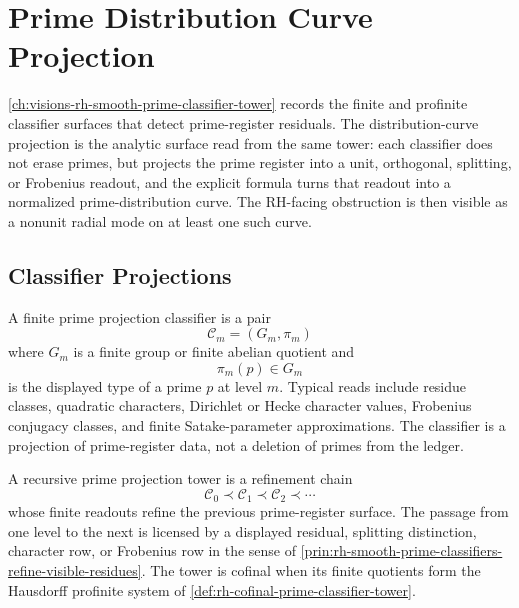 \chapter{Prime Distribution Curve Projection}
\label{ch:visions-rh-prime-distribution-curve-projection}

\autoref{ch:visions-rh-smooth-prime-classifier-tower} records the
finite and profinite classifier surfaces that detect prime-register
residuals.  The distribution-curve projection is the analytic surface
read from the same tower: each classifier does not erase primes, but
projects the prime register into a unit, orthogonal, splitting, or
Frobenius readout, and the explicit formula turns that readout into a
normalized prime-distribution curve.  The RH-facing obstruction is then
visible as a nonunit radial mode on at least one such curve.

\section{Classifier Projections}
\label{sec:rh-prime-distribution-classifier-projections}

\begin{definition}
\label{def:rh-finite-prime-projection-classifier}
A finite prime projection classifier is a pair
$$
\mathcal C_m=(G_m,\pi_m)
$$
where $G_m$ is a finite group or finite abelian quotient and
$$
\pi_m(p)\in G_m
$$
is the displayed type of a prime $p$ at level $m$.  Typical reads include
residue classes, quadratic characters, Dirichlet or Hecke character
values, Frobenius conjugacy classes, and finite Satake-parameter
approximations.  The classifier is a projection of prime-register data,
not a deletion of primes from the ledger.
\end{definition}

\begin{definition}
\label{def:rh-recursive-prime-projection-tower}
A recursive prime projection tower is a refinement chain
$$
\mathcal C_0\prec\mathcal C_1\prec\mathcal C_2\prec\cdots
$$
whose finite readouts refine the previous prime-register surface.  The
passage from one level to the next is licensed by a displayed residual,
splitting distinction, character row, or Frobenius row in the sense of
\autoref{prin:rh-smooth-prime-classifiers-refine-visible-residues}.
The tower is cofinal when its finite quotients form the Hausdorff
profinite system of
\autoref{def:rh-cofinal-prime-classifier-tower}.
\end{definition}

